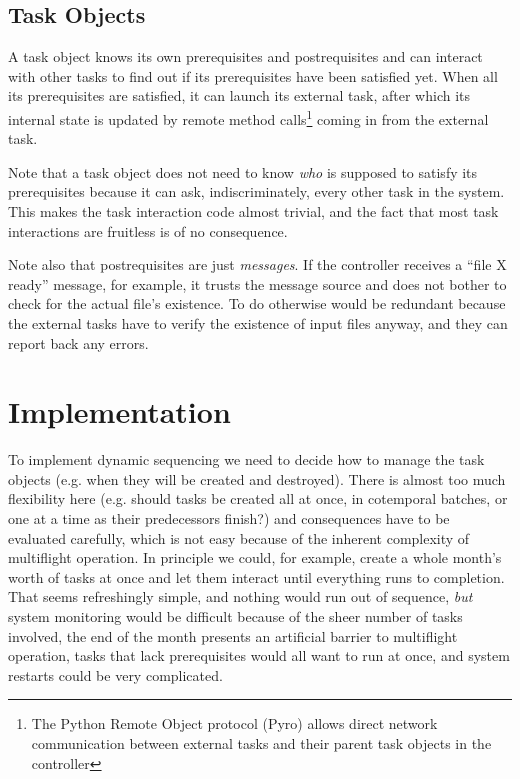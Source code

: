 \documentclass[a4paper,12pt]{amsart}
\begin{document}
\subsection{Task Objects}

A task object knows its own prerequisites and postrequisites and can
interact with other tasks to find out if its prerequisites have been
satisfied yet. When all its prerequisites are satisfied, it can launch
its external task, after which its internal state is updated by remote
method calls\footnote{The Python Remote Object protocol (Pyro) allows
direct network communication between external tasks and their parent
task objects in the controller} coming in from the external task. 

Note that a task object does not need to know {\em who} is supposed to
satisfy its prerequisites because it can ask, indiscriminately, every
other task in the system. This makes the task interaction code almost
trivial, and the fact that most task interactions are fruitless is of no
consequence. 

Note also that postrequisites are just {\em messages}. If the controller
receives a ``file X ready'' message, for example, it trusts the message
source and does not bother to check for the actual file's existence. To
do otherwise would be redundant because the external tasks have to
verify the existence of input files anyway, and they can report back any
errors.


\section{Implementation}

To implement dynamic sequencing we need to decide how to manage the task
objects (e.g. when they will be created and destroyed). There is almost
too much flexibility here (e.g.  should tasks be created all at once, in
cotemporal batches, or one at a time as their predecessors finish?) and
consequences have to be evaluated carefully, which is not easy because
of the inherent complexity of multiflight operation. In principle we
could, for example, create a whole month's worth of tasks at once and
let them interact until everything runs to completion. That seems
refreshingly simple, and nothing would run out of sequence, {\em but}
system monitoring would be difficult because of the sheer number of
tasks involved, the end of the month presents an artificial barrier to
multiflight operation, tasks that lack prerequisites would all want to
run at once, and system restarts could be very complicated. 
\end{document}
